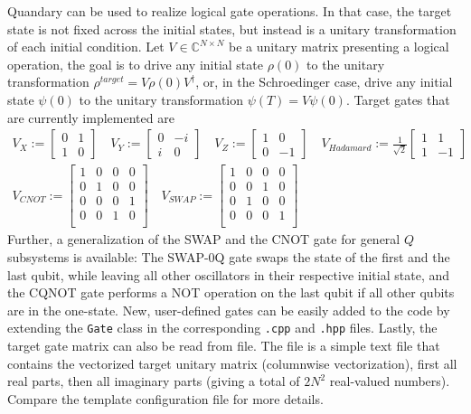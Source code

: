 \documentclass[11pt]{article}
\newcommand{\C}{\mathds{C}}
\begin{document}
Quandary can be used to realize logical gate operations. In that case, the target state is not fixed across the initial states, but instead is a unitary transformation of each initial condition. Let $V\in \C^{N\times N}$ be a unitary matrix presenting a logical operation, the goal is to drive any initial state $\rho(0)$ to the unitary transformation $\rho^{target} = V\rho(0)V^{\dagger}$, or, in the Schroedinger case, drive any initial state $\psi(0)$ to the unitary transformation $\psi(T) =  V\psi(0)$.
Target gates that are currently implemented are
\begin{align}
  V_{X} := \begin{bmatrix} 0 & 1 \\ 1 & 0  \end{bmatrix} \quad
  V_{Y} := \begin{bmatrix} 0 & -i \\ i & 0 \end{bmatrix} \quad
  V_{Z} := \begin{bmatrix} 1 & 0 \\ 0 & -1 \end{bmatrix} \quad 
  V_{Hadamard} := \frac{1}{\sqrt{2}} 
           \begin{bmatrix} 1 & 1 \\ 1 & -1 \end{bmatrix} \\
  V_{CNOT} := \begin{bmatrix} 1  & 0 & 0 & 0 \\ 
                               0  & 1 & 0 & 0 \\ 
                               0  & 0 & 0 & 1 \\ 
                               0  & 0 & 1 & 0 \\ 
                \end{bmatrix} \quad 
  V_{SWAP} := \begin{bmatrix}
    1 & 0 & 0 & 0 \\
    0 & 0 & 1 & 0 \\
    0 & 1 & 0 & 0 \\
    0 & 0 & 0 & 1 \\
  \end{bmatrix}
\end{align}
Further, a generalization of the SWAP and the CNOT gate for general $Q$ subsystems is available: The SWAP-0Q gate swaps the state of the first and the last qubit, while leaving all other oscillators in their respective initial state, and the CQNOT gate performs a NOT operation on the last qubit if all other qubits are in the one-state.
New, user-defined gates can be easily added to the code by extending the \texttt{Gate} class in the corresponding \texttt{.cpp} and \texttt{.hpp} files. 
Lastly, the target gate matrix can also be read from file. The file is a simple text file that contains the vectorized target unitary matrix (columnwise vectorization), first all real parts, then all imaginary parts (giving a total of $2N^2$ real-valued numbers). Compare the template configuration file for more details. 
\end{document}
